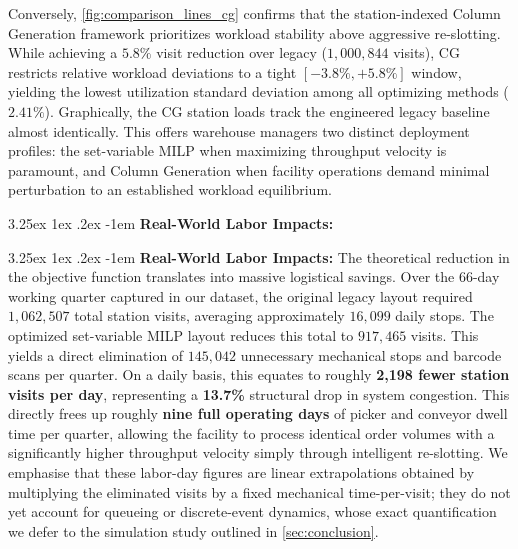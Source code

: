 \documentclass[preprint,review,11pt,authoryear]{elsarticle}
\makeatletter
\renewcommand\paragraph{\@startsection{paragraph}{4}{\z@}
  {3.25ex \@plus1ex \@minus.2ex}
  {-1em}
  {\normalfont\normalsize\itshape}}
\makeatother
\begin{document}
Conversely, \cref{fig:comparison_lines_cg} confirms that the station-indexed Column Generation framework prioritizes workload stability above aggressive re-slotting. While achieving a $5.8\%$ visit reduction over legacy ($1,000,844$ visits), CG restricts relative workload deviations to a tight $[-3.8\%, +5.8\%]$ window, yielding the lowest utilization standard deviation among all optimizing methods ($2.41\%$). Graphically, the CG station loads track the engineered legacy baseline almost identically. This offers warehouse managers two distinct deployment profiles: the set-variable MILP when maximizing throughput velocity is paramount, and Column Generation when facility operations demand minimal perturbation to an established workload equilibrium.

\paragraph{\textbf{Real-World Labor Impacts: }}

\paragraph{\textbf{Real-World Labor Impacts: }}
The theoretical reduction in the objective function translates into massive logistical savings. Over the 66-day working quarter captured in our dataset, the original legacy layout required $1,062,507$ total station visits, averaging approximately $16,099$ daily stops. The optimized set-variable MILP layout reduces this total to $917,465$ visits. This yields a direct elimination of $145,042$ unnecessary mechanical stops and barcode scans per quarter. On a daily basis, this equates to roughly \textbf{2,198 fewer station visits per day}, representing a \textbf{13.7\%} structural drop in system congestion. This directly frees up roughly \textbf{nine full operating days} of picker and conveyor dwell time per quarter, allowing the facility to process identical order volumes with a significantly higher throughput velocity simply through intelligent re-slotting. We emphasise that these labor-day figures are linear extrapolations obtained by multiplying the eliminated visits by a fixed mechanical time-per-visit; they do not yet account for queueing or discrete-event dynamics, whose exact quantification we defer to the simulation study outlined in \cref{sec:conclusion}.
\end{document}
